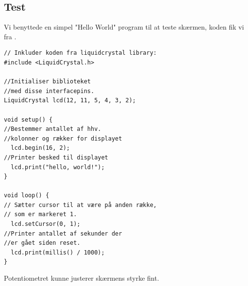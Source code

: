 
 
\subsection{Test}
Vi benyttede en simpel "Hello World" program til at teste skærmen, koden fik vi fra \cite{arduinoLCD}.





\begin{lstlisting}[caption=kodeeksempel "Hello World" med timer, label={alg:helloworld}]
// Inkluder koden fra liquidcrystal library:
#include <LiquidCrystal.h>

//Initialiser biblioteket 
//med disse interfacepins.
LiquidCrystal lcd(12, 11, 5, 4, 3, 2);

void setup() {
//Bestemmer antallet af hhv.
//kolonner og rækker for displayet
  lcd.begin(16, 2);
//Printer besked til displayet
  lcd.print("hello, world!");
}

void loop() {
// Sætter cursor til at være på anden række,
// som er markeret 1.
  lcd.setCursor(0, 1);
//Printer antallet af sekunder der 
//er gået siden reset.
  lcd.print(millis() / 1000);
}
\end{lstlisting}


Potentiometret kunne justerer skærmens styrke fint.
